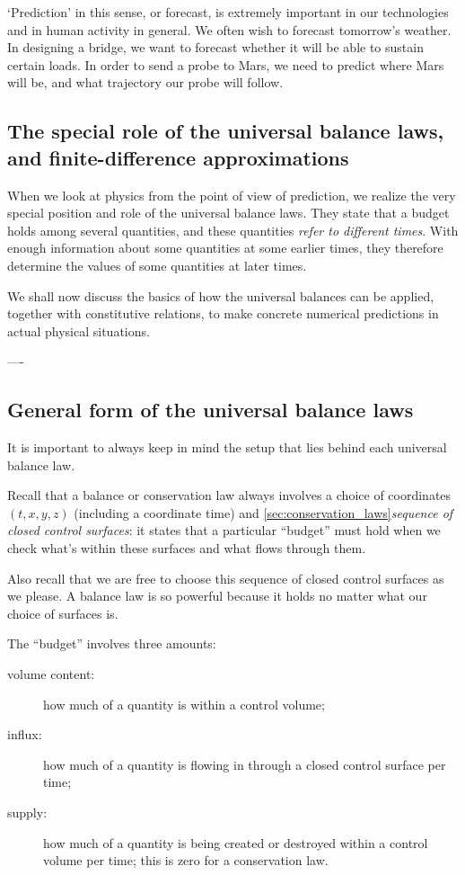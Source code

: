 \enquote*{Prediction} in this sense, or forecast, is extremely important in our technologies and in human activity in general. We often wish to forecast tomorrow's weather. In designing a bridge, we want to forecast whether it will be able to sustain certain loads. In order to send a probe to Mars, we need to predict where Mars will be, and what trajectory our probe will follow.

\subsection{The special role of the universal balance laws, and finite-difference approximations}
\label{sec:forecast_balances}

When we look at physics from the point of view of prediction, we realize the very special position and role of the universal balance laws. They state that a budget holds among several quantities, and these quantities \emph{refer to different times}. With enough information about some quantities at some earlier times, they therefore determine the values of some quantities at later times.

We shall now discuss the basics of how the universal balances can be applied, together with constitutive relations, to make concrete numerical predictions in actual physical situations.

\medskip

----

\subsection{General form of the universal balance laws}
\label{sec:common_formulation}

It is important to always keep in mind the setup that lies behind each universal balance law.

Recall that a balance or conservation law always involves a choice of coordinates $(t,x,y,z)$ (including a coordinate time) and \autoref{sec:conservation_laws}{\emph{sequence of closed control surfaces}}: it states that a particular \enquote{budget} must hold when we check what's within these surfaces and what flows through them.

Also recall that we are free to choose this sequence of closed control surfaces as we please. A balance law is so powerful because it holds no matter what our choice of surfaces is.

The \enquote{budget} involves three amounts:
\begin{description}
\item[volume content:] how much of a quantity is within a control volume;
\item[influx:] how much of a quantity is flowing in through a closed control surface per time;
\item[supply:] how much of a quantity is being created or destroyed within a control volume per time; this is zero for a conservation law.
\end{description}

